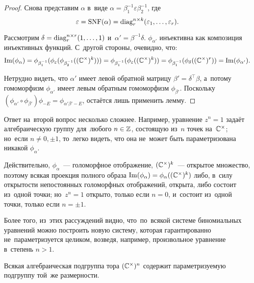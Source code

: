 \documentclass{article}
\begin{document}
\begin{proof}
    Снова представим $\alpha$ в~виде $\alpha = \beta_1^{-1} \varepsilon \beta_2^{-1}$, где
    $$
        \varepsilon = \mathrm{SNF}(\alpha) = \mathrm{diag}^{n \times k}_r(\varepsilon_1, \ldots, \varepsilon_r).
    $$

    Рассмотрим $\delta = \mathrm{diag}^{n \times r}_r(1, \ldots, 1)$ и~$\alpha' = \beta^{-1} \delta$.
    $\phi_{\alpha'}$ инъективна как композиция инъективных функций. С~другой стороны, очевидно, что:
    $$
        \mathrm{Im}(\phi_\alpha) = \phi_{\beta_1^{-1}} (\phi_\varepsilon (\phi_{\beta_2^{-1}} ((\mathbb{C}^\times)^k)))
                            = \phi_{\beta_1^{-1}} (\phi_\varepsilon ((\mathbb{C}^\times)^k))
                            = \phi_{\beta_1^{-1}} (\phi_{\delta} ((\mathbb{C}^\times)^r))
                            = \mathrm{Im}(\phi_{\alpha'}).
    $$

    Нетрудно видеть, что $\alpha'$ имеет левой обратной матрицу $\beta' = \delta^{\top} \beta$,
    а~потому гомоморфизм $\phi_{\alpha'}$ имеет левым обратным гомоморфизм $\phi_{\beta'}$.
    Поскольку $(\phi_{\alpha'} \circ \phi_{\beta'}) \phi_{-E} = \phi_{\alpha' \beta' - E}$, остаётся лишь применить лемму.
\end{proof}

Ответ на~второй вопрос несколько сложнее. Например, уравнение $z^n = 1$ задаёт алгебраическую
группу для~любого $n \in \mathbb{Z}$, состоящую из~$n$ точек на~$\mathbb{C}^\times$; но~если $n \neq 0, \pm 1$,
то~легко видеть, что она не~может быть параметризована никакой $\phi_\alpha$.

Действительно, $\phi_\alpha$~— голоморфное отображение, $(\mathbb{C}^\times)^k$~— открытое множество,
поэтому всякая проекция полного образа $\mathrm{Im}(\phi_\alpha) = \phi_\alpha((\mathbb{C}^\times)^k)$ либо, в~силу
открытости непостоянных голоморфных отображений, открыта, либо состоит из~одной точки; но~$z^n = 1$
открыто, только если $n = 0$, и~состоит из~одной точки, только если $n = \pm 1$.

Более того, из~этих рассуждений видно, что~по~всякой системе биномиальных уравнений можно построить новую систему,
которая гарантированно не~параметризуется целиком, возведя, например, произвольное уравнение в~степень $n > 1$.

\begin{theorem*}
    Всякая алгебраическая подгруппа тора $(\mathbb{C}^\times)^n$ содержит параметризуемую подгруппу той~же размерности.
\end{theorem*}
\end{document}
